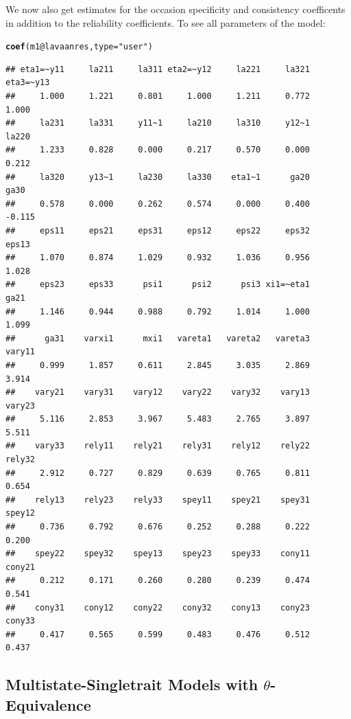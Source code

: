 \documentclass[10pt]{article}\usepackage{graphicx, color}
\makeatletter
\newcommand{\hlfunctioncall}[1]{\textcolor[rgb]{0.501960784313725,0,0.329411764705882}{\textbf{#1}}}%
\newcommand{\hlstring}[1]{\textcolor[rgb]{0.6,0.6,1}{#1}}%
\newenvironment{kframe}{%
 \def\at@end@of@kframe{}%
 \ifinner\ifhmode%
  \def\at@end@of@kframe{\end{minipage}}%
  \begin{minipage}{\columnwidth}%
 \fi\fi%
 \def\FrameCommand##1{\hskip\@totalleftmargin \hskip-\fboxsep
 \colorbox{shadecolor}{##1}\hskip-\fboxsep
     \hskip-\linewidth \hskip-\@totalleftmargin \hskip\columnwidth}%
 \MakeFramed {\advance\hsize-\width
   \@totalleftmargin\z@ \linewidth\hsize
   \@setminipage}}%
 {\par\unskip\endMakeFramed%
 \at@end@of@kframe}
\newenvironment{knitrout}{}{} %
\makeatother
\begin{document}
%
We now also get estimates for the occasion specificity and consistency coefficents in addition to the reliability coefficients. To see all parameters of the model:
%
\begin{knitrout}
\color{fgcolor}\begin{kframe}
\begin{alltt}
\hlfunctioncall{coef}(m1@lavaanres, type = \hlstring{"user"})
\end{alltt}
\begin{verbatim}
## eta1=~y11     la211     la311 eta2=~y12     la221     la321 eta3=~y13 
##     1.000     1.221     0.801     1.000     1.211     0.772     1.000 
##     la231     la331     y11~1     la210     la310     y12~1     la220 
##     1.233     0.828     0.000     0.217     0.570     0.000     0.212 
##     la320     y13~1     la230     la330    eta1~1      ga20      ga30 
##     0.578     0.000     0.262     0.574     0.000     0.400    -0.115 
##     eps11     eps21     eps31     eps12     eps22     eps32     eps13 
##     1.070     0.874     1.029     0.932     1.036     0.956     1.028 
##     eps23     eps33      psi1      psi2      psi3 xi1=~eta1      ga21 
##     1.146     0.944     0.988     0.792     1.014     1.000     1.099 
##      ga31    varxi1      mxi1   vareta1   vareta2   vareta3    vary11 
##     0.999     1.857     0.611     2.845     3.035     2.869     3.914 
##    vary21    vary31    vary12    vary22    vary32    vary13    vary23 
##     5.116     2.853     3.967     5.483     2.765     3.897     5.511 
##    vary33    rely11    rely21    rely31    rely12    rely22    rely32 
##     2.912     0.727     0.829     0.639     0.765     0.811     0.654 
##    rely13    rely23    rely33    spey11    spey21    spey31    spey12 
##     0.736     0.792     0.676     0.252     0.288     0.222     0.200 
##    spey22    spey32    spey13    spey23    spey33    cony11    cony21 
##     0.212     0.171     0.260     0.280     0.239     0.474     0.541 
##    cony31    cony12    cony22    cony32    cony13    cony23    cony33 
##     0.417     0.565     0.599     0.483     0.476     0.512     0.437
\end{verbatim}
\end{kframe}
\end{knitrout}

%



\subsection{Multistate-Singletrait Models with $\theta$-Equivalence}
\end{document}

